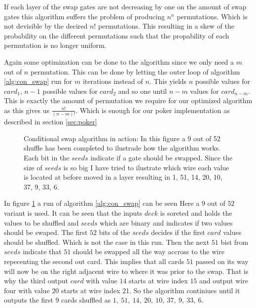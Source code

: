 \documentclass[twoside,11pt,openright]{report}
\begin{document}
If each layer of the swap gates are not decreasing by one on the amount of swap gates this algorithm suffers the problem of producing $n^n$ permutations. Which is not devisible by the decired $n!$ permutations. This resulting in a skew of the probability on the different permutations such that the propability of each permutation is no longer uniform.

\bigskip

Again some optimization can be done to the algorithm since we only need a $m$ out of $n$ permutation. This can be done by letting the outer loop of algorithm \ref{alg:con_swap} run for $m$ iterations instead of $n$. This yields $n$ possible values for $card_1$, $n-1$ possible values for $card_2$ and so one until $n-m$ values for $card_{n-m}$. This is exactly the amount of permutation we require for our optimized algorithm as this gives us $\frac{n!}{(n-m)!}$. Which is enough for our poker implementation as described in section \ref{sec:poker}

\bigskip

\begin{figure}
\centering
\scalebox{1.5}{}
\caption{Conditional swap algorithm in action: In this figure a 9 out of 52 shuffle has been completed to ilustrade how the algorithm works. Each bit in the $seeds$ indicate if a gate should be swapped. Since the size of $seeds$ is so big I have tried to ilustrate which wire each value is located at before moved in a layer resulting in 1, 51, 14, 20, 10, 37, 9, 33, 6.}
\label{fig:con_swap}
\end{figure}

In figure \ref{fig:con_swap} a run of algorithm \ref{alg:con_swap} can be seen Here a $9$ out of $52$ variant is used. It can be seen that the inputs $deck$ is soreted and holds the values to be shuffled and $seeds$ which are binary and indicates if two values should be swaped. The first $52$ bits of the $seeds$ decides if the first $card$ values should be shuffled. Which is not the case in this run. Then the next $51$ bist from $seeds$ indicate that $51$ should be swapped all the way accross to the wire repecenting the second out card. This implies that all cards $51$ passed on its way will now be on the right adjacent wire to where it was prior to the swap. That is why the third output $card$ with value $14$ starts at wire index $15$ and output wire four with value $20$ starts at wire index 21. So the algorithm continiues until it outputs the first $9$ cards shuffled as $1,~51,~14,~20,~10,~37,~9,~33,~6$.
\end{document}
